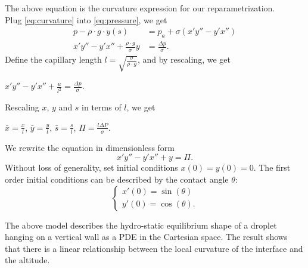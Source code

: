 \documentclass{jfm}
\begin{document}
    The above equation is the curvature expression for our reparametrization.\\
    Plug \ref{eq:curvature} into \ref{eq:pressure}, we get\\
    \begin{align}
        p-\rho\cdot{g}\cdot{y(s)}&=p_{a}+\sigma(x'y''-y'x'')\\
        x'y''-y'x''+\frac{\rho\cdot{g}}{\sigma}y&=\frac{\Delta{p}}{\sigma}.
    \end{align}
    Define the capillary length $l=\sqrt{\frac{\sigma}{\rho\cdot{g}}}$,
    and by rescaling, we get\\
    \begin{center}
        $x'y''-y'x''+\frac{u}{l^2}=\frac{\Delta{p}}{\sigma}$.
    \end{center}
    Rescaling $x$, $y$ and $s$ in terms of $l$, we get\\
    \begin{center}
        $\bar{x}=\frac{x}{l}$, \quad $\bar{y}=\frac{y}{l}$, \quad $\bar{s}=\frac{s}{l}$, \quad $\Pi=\frac{l\Delta P}{\sigma}$.
    \end{center}
    We rewrite the equation in dimensionless form\\
    \begin{equation}
        x'y''-y'x''+y=\Pi.
    \end{equation}
    Without loss of generality, set initial conditions $x(0)=y(0)=0$. The first order initial conditions can be described by the contact angle $\theta$: 
    \begin{equation}
        \begin{cases}
            x'(0)=\sin(\theta)\\
            y'(0)=\cos(\theta).
        \end{cases}
    \end{equation}
    
    The above model describes the hydro-static equilibrium shape of a droplet hanging on a vertical wall as a PDE in the Cartesian space. The result shows that there is a linear relationship between the local curvature of the interface and the altitude. 







\end{document}
